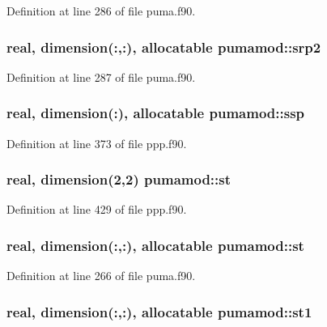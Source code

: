 \-Definition at line 286 of file puma.\-f90.

\hypertarget{classpumamod_aedc7ade1364d2e510fe5a9e17d2ee551}{
\subsubsection[{srp2}]{\setlength{\rightskip}{0pt plus 5cm}real, dimension(\-:,\-:), allocatable {\bf pumamod\-::srp2}}}
\label{classpumamod_aedc7ade1364d2e510fe5a9e17d2ee551}


\-Definition at line 287 of file puma.\-f90.

\hypertarget{classpumamod_a9e408d75104293064d995076d4dbbce4}{
\subsubsection[{ssp}]{\setlength{\rightskip}{0pt plus 5cm}real, dimension(\-:), allocatable {\bf pumamod\-::ssp}}}
\label{classpumamod_a9e408d75104293064d995076d4dbbce4}


\-Definition at line 373 of file ppp.\-f90.

\hypertarget{classpumamod_a74c9dc30cb632807156f147f54448742}{
\subsubsection[{st}]{\setlength{\rightskip}{0pt plus 5cm}real, dimension(2,2) {\bf pumamod\-::st}}}
\label{classpumamod_a74c9dc30cb632807156f147f54448742}


\-Definition at line 429 of file ppp.\-f90.

\hypertarget{classpumamod_a9e5f2e6b01b35c141b673be058d6ba52}{
\subsubsection[{st}]{\setlength{\rightskip}{0pt plus 5cm}real, dimension(\-:,\-:), allocatable {\bf pumamod\-::st}}}
\label{classpumamod_a9e5f2e6b01b35c141b673be058d6ba52}


\-Definition at line 266 of file puma.\-f90.

\hypertarget{classpumamod_aad136f237f5ca5d94b6f0e0e742864df}{
\subsubsection[{st1}]{\setlength{\rightskip}{0pt plus 5cm}real, dimension(\-:,\-:), allocatable {\bf pumamod\-::st1}}}
\label{classpumamod_aad136f237f5ca5d94b6f0e0e742864df}


